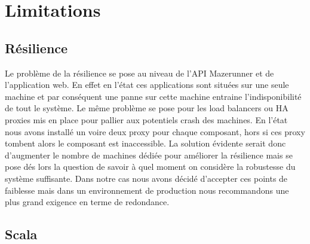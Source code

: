 \section{Limitations}

\subsection{Résilience}

Le problème de la résilience se pose au niveau de l'API Mazerunner et de l'application web. 
En effet en l'état ces applications sont situées sur une seule machine et par conséquent une panne sur cette machine entraine l'indisponibilité de tout le système. 
Le même problème se pose pour les load balancers ou HA proxies mis en place pour pallier aux potentiels crash des machines. 
En l'état nous avons installé un voire deux proxy pour chaque composant, hors si ces proxy tombent alors le composant est inaccessible. 
La solution évidente serait donc d'augmenter le nombre de machines dédiée pour améliorer la résilience mais se pose dés lors la question de savoir à quel moment on considère la robustesse du système suffisante. 
Dans notre cas nous avons décidé d'accepter ces points de faiblesse mais dans un environnement de production nous recommandons une plus grand exigence en terme de redondance.

\subsection{Scala}


